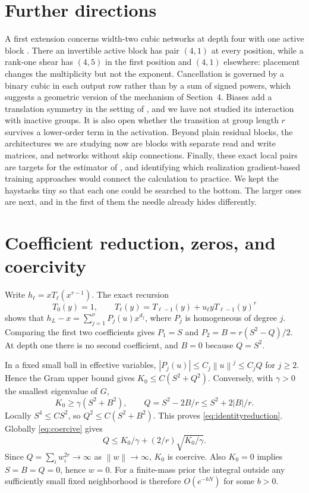 \documentclass[11pt,letterpaper]{amsart}
\theoremstyle{scplain}
\newcommand{\norm}[1]{\left\lVert#1\right\rVert}
\begin{document}
\section{Further directions}
A first extension concerns width-two cubic networks at depth four with one active block \citep{faber2026vector}. There an invertible active block has pair $(4,1)$ at every position, while a rank-one shear has $(4,5)$ in the first position and $(4,1)$ elsewhere: placement changes the multiplicity but not the exponent. Cancellation is governed by a binary cubic in each output row rather than by a sum of signed powers, which suggests a geometric version of the mechanism of Section~4. Biases add a translation symmetry in the setting of \citet{dahlgren2026}, and we have not studied its interaction with inactive groups. It is also open whether the transition at group length $r$ survives a lower-order term in the activation. Beyond plain residual blocks, the architectures we are studying now are blocks with separate read and write matrices, and networks without skip connections. Finally, these exact local pairs are targets for the estimator of \citet{lau2025}, and identifying which realization gradient-based training approaches would connect the calculation to practice. We kept the haystacks tiny so that each one could be searched to the bottom. The larger ones are next, and in the first of them the needle already hides differently.

\clearpage
\appendix
\section{Coefficient reduction, zeros, and coercivity}\label{app:coeff}
Write $h_\ell=xT_\ell(x^{r-1})$. The exact recursion
\[
 T_0(y)=1,\qquad T_\ell(y)=T_{\ell-1}(y)+u_\ell yT_{\ell-1}(y)^r
\]
shows that $h_L-x=\sum_{j=1}^{\nu} P_j(u)x^{d_j}$, where $P_j$ is homogeneous of degree $j$. Comparing the first two coefficients gives $P_1=S$ and $P_2=B=r(S^2-Q)/2$. At depth one there is no second coefficient, and $B=0$ because $Q=S^2$.

In a fixed small ball in effective variables, $|P_j(u)|\le C_j\norm{u}^j\le C_jQ$ for $j\ge2$. Hence the Gram upper bound gives $K_0\le C(S^2+Q^2)$. Conversely, with $\gamma>0$ the smallest eigenvalue of $G$,
\begin{equation}\label{eq:coercive}
 K_0\ge\gamma(S^2+B^2),\qquad
 Q=S^2-2B/r\le S^2+2|B|/r.
\end{equation}
Locally $S^4\le C S^2$, so $Q^2\le C(S^2+B^2)$. This proves \eqref{eq:identityreduction}. Globally \eqref{eq:coercive} gives
\[
 Q\le K_0/\gamma+(2/r)\sqrt{K_0/\gamma}.
\]
Since $Q=\sum_iw_i^{2r}\to\infty$ as $\norm{w}\to\infty$, $K_0$ is coercive. Also $K_0=0$ implies $S=B=Q=0$, hence $w=0$. For a finite-mass prior the integral outside any sufficiently small fixed neighborhood is therefore $O(e^{-bN})$ for some $b>0$.
\end{document}
